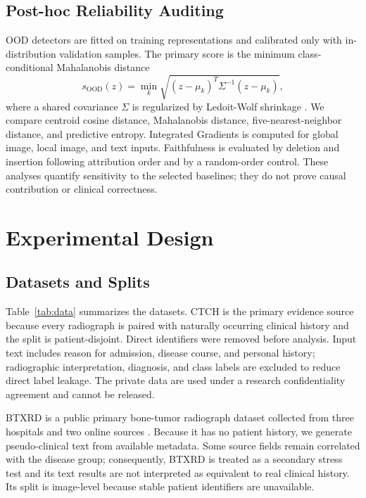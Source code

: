 \documentclass[runningheads]{llncs}
\begin{document}
\subsection{Post-hoc Reliability Auditing}

OOD detectors are fitted on training representations and calibrated only with in-distribution validation samples. The primary score is the minimum class-conditional Mahalanobis distance
\begin{equation}
s_{\mathrm{OOD}}(z)=\min_k\sqrt{(z-\mu_k)^T\Sigma^{-1}(z-\mu_k)},
\end{equation}
where a shared covariance $\Sigma$ is regularized by Ledoit-Wolf shrinkage \cite{LedoitWolf2004}. We compare centroid cosine distance, Mahalanobis distance, five-nearest-neighbor distance, and predictive entropy. Integrated Gradients is computed for global image, local image, and text inputs. Faithfulness is evaluated by deletion and insertion following attribution order and by a random-order control. These analyses quantify sensitivity to the selected baselines; they do not prove causal contribution or clinical correctness.

\section{Experimental Design}

\subsection{Datasets and Splits}

Table~\ref{tab:data} summarizes the datasets. CTCH is the primary evidence source because every radiograph is paired with naturally occurring clinical history and the split is patient-disjoint. Direct identifiers were removed before analysis. Input text includes reason for admission, disease course, and personal history; radiographic interpretation, diagnosis, and class labels are excluded to reduce direct label leakage. The private data are used under a research confidentiality agreement and cannot be released.

BTXRD is a public primary bone-tumor radiograph dataset collected from three hospitals and two online sources \cite{Yao2025}. Because it has no patient history, we generate pseudo-clinical text from available metadata. Some source fields remain correlated with the disease group; consequently, BTXRD is treated as a secondary stress test and its text results are not interpreted as equivalent to real clinical history. Its split is image-level because stable patient identifiers are unavailable.
\end{document}
